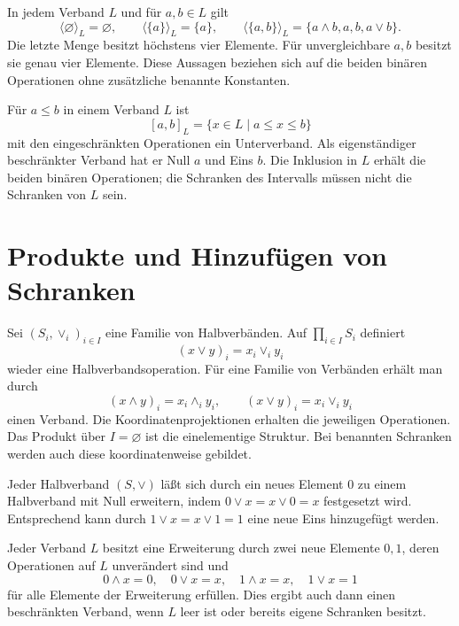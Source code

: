 \begin{theorem}
\label{b45guide:thm:two-generators}
In jedem Verband $L$ und für $a,b\in L$ gilt
\[
 \langle\varnothing\rangle_L=\varnothing,\qquad
 \langle\{a\}\rangle_L=\{a\},\qquad
 \langle\{a,b\}\rangle_L=\{a\wedge b,a,b,a\vee b\}.
\]
Die letzte Menge besitzt höchstens vier Elemente.
Für unvergleichbare $a,b$ besitzt sie genau vier Elemente.
Diese Aussagen beziehen sich auf die beiden binären Operationen
ohne zusätzliche benannte Konstanten.
\end{theorem}

\begin{theorem}[Verbandsintervalle]
Für $a\leq b$ in einem Verband $L$ ist
\[
 [a,b]_L=\{x\in L\mid a\leq x\leq b\}
\]
mit den eingeschränkten Operationen ein Unterverband.
Als eigenständiger beschränkter Verband hat er Null $a$ und Eins $b$.
Die Inklusion in $L$ erhält die beiden binären Operationen;
die Schranken des Intervalls müssen nicht die Schranken von $L$ sein.
\end{theorem}

\section{Produkte und Hinzufügen von Schranken}

\begin{theorem}
\label{b45guide:thm:products}
Sei $(S_i,\vee_i)_{i\in I}$ eine Familie von Halbverbänden.
Auf $\prod_{i\in I}S_i$ definiert
\[
 (x\vee y)_i=x_i\vee_i y_i
\]
wieder eine Halbverbandsoperation.
Für eine Familie von Verbänden erhält man durch
\[
 (x\wedge y)_i=x_i\wedge_i y_i,\qquad
 (x\vee y)_i=x_i\vee_i y_i
\]
einen Verband. Die Koordinatenprojektionen erhalten die
jeweiligen Operationen.
Das Produkt über $I=\varnothing$ ist die einelementige Struktur.
Bei benannten Schranken werden auch diese koordinatenweise gebildet.
\end{theorem}

\begin{theorem}
\label{b45guide:thm:adjoin-bounds}
Jeder Halbverband $(S,\vee)$ läßt sich durch ein neues Element $0$
zu einem Halbverband mit Null erweitern, indem $0\vee x=x\vee0=x$
festgesetzt wird. Entsprechend kann durch $1\vee x=x\vee1=1$
eine neue Eins hinzugefügt werden.

Jeder Verband $L$ besitzt eine Erweiterung durch zwei neue Elemente
$0,1$, deren Operationen auf $L$ unverändert sind und
\[
 0\wedge x=0,\quad 0\vee x=x,\quad
 1\wedge x=x,\quad 1\vee x=1
\]
für alle Elemente der Erweiterung erfüllen.
Dies ergibt auch dann einen beschränkten Verband, wenn $L$ leer ist
oder bereits eigene Schranken besitzt.
\end{theorem}
